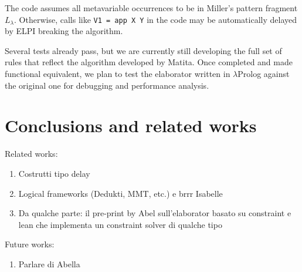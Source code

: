 \documentclass{easychair}
\begin{document}
The code assumes all metavariable occurrences to be in Miller's pattern fragment $L_\lambda$. Otherwise, calls like \verb+V1 = app X Y+ in the code may be automatically delayed by ELPI breaking the algorithm.

Several tests already pass, but we are currently still developing the full set of rules that reflect the algorithm developed by Matita. Once completed and made functional equivalent, we plan to test the elaborator written in $\lambda$Prolog against the original one for debugging and performance analysis.

\section{Conclusions and related works}\label{sec:conclusion}
Related works:
\begin{enumerate}
\item Costrutti tipo delay
\item Logical frameworks (Dedukti, MMT, etc.) e brrr Isabelle
\item Da qualche parte: il pre-print by Abel sull'elaborator basato su
 constraint e lean che implementa un constraint solver di qualche tipo
\end{enumerate}

Future works:
\begin{enumerate}
\item Parlare di Abella
\end{enumerate}

\label{sect:bib}


\end{document}
